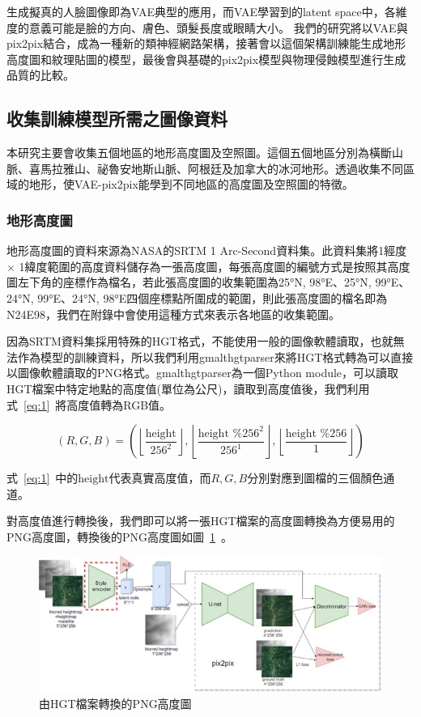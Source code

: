 \documentclass[a4paper, 12pt]{article}
\begin{document}
生成擬真的人臉圖像即為VAE典型的應用，而VAE學習到的latent space中，各維度的意義可能是臉的方向、膚色、頭髮長度或眼睛大小。
我們的研究將以VAE與pix2pix結合，成為一種新的類神經網路架構，接著會以這個架構訓練能生成地形高度圖和紋理貼圖的模型，最後會與基礎的pix2pix模型與物理侵蝕模型進行生成品質的比較。

\subsection{收集訓練模型所需之圖像資料}
本研究主要會收集五個地區的地形高度圖及空照圖。這個五個地區分別為橫斷山脈、喜馬拉雅山、祕魯安地斯山脈、阿根廷及加拿大的冰河地形。透過收集不同區域的地形，使VAE-pix2pix能學到不同地區的高度圖及空照圖的特徵。
\subsubsection{地形高度圖}
地形高度圖的資料來源為NASA的SRTM 1 Arc-Second資料集\cite{srtm1arc}。此資料集將1經度 $\times$ 1緯度範圍的高度資料儲存為一張高度圖，每張高度圖的編號方式是按照其高度圖左下角的座標作為檔名，若此張高度圖的收集範圍為25°N, 98°E、25°N, 99°E、24°N, 99°E、24°N, 98°E四個座標點所圍成的範圍，則此張高度圖的檔名即為N24E98，我們在附錄中會使用這種方式來表示各地區的收集範圍。

因為SRTM資料集採用特殊的HGT格式，不能使用一般的圖像軟體讀取，也就無法作為模型的訓練資料，所以我們利用gmalthgtparser來將HGT格式轉為可以直接以圖像軟體讀取的PNG格式。gmalthgtparser為一個Python module，可以讀取HGT檔案中特定地點的高度值(單位為公尺)，讀取到高度值後，我們利用式~\ref{eq:1}~將高度值轉為RGB值。

\begin{equation}
    (R, G, B)=\left(\left\lfloor\frac{\text {height}}{256^{2}}\right\rfloor,\left\lfloor\frac{\text {height } \% 256^{2}}{256^{1}}\right\rfloor,\left\lfloor\frac{\text {height } \% 256}{1}\right\rfloor\right)
    \label{eq:1}
\end{equation}

式~\ref{eq:1}~中的$\text{height}$代表真實高度值，而$R,G,B$分別對應到圖檔的三個顏色通道。

對高度值進行轉換後，我們即可以將一張HGT檔案的高度圖轉換為方便易用的PNG高度圖，轉換後的PNG高度圖如圖~\ref{fig:7}~。

\begin{figure}[htbp]
    \centering
    \includegraphics[width=0.45\linewidth]{fig/7.jpg}
    \caption{由HGT檔案轉換的PNG高度圖}
    \label{fig:7}
\end{figure}
\end{document}
